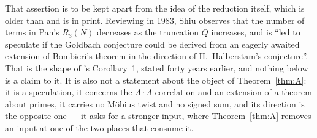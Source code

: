\documentclass[11pt,a4paper]{article}
\theoremstyle{plain}
\theoremstyle{definition}
\theoremstyle{remark}
\begin{document}
That assertion is to be kept apart from the idea of the reduction
itself, which is older than \cite{HL} and is in print. Reviewing
\cite{Pan} in 1983, Shiu \cite{Shiu} observes that the number of terms
in Pan's $R_3(N)$ decreases as the truncation $Q$ increases, and is
``led to speculate if the Goldbach conjecture could be derived from an
eagerly awaited extension of Bombieri's theorem in the direction of
H.~Halberstam's conjecture''. That is the shape of \cite{HL}'s
Corollary~1, stated forty years earlier, and nothing below is a claim
to it. It is also not a statement about the object of
Theorem~\ref{thm:A}: it is a speculation, it concerns the
$\Lambda\cdot\Lambda$ correlation and an extension of a theorem about
primes, it carries no M\"obius twist and no signed sum, and its
direction is the opposite one --- it asks for a stronger input, where
Theorem~\ref{thm:A} removes an input at one of the two places that
consume it.
\end{document}

